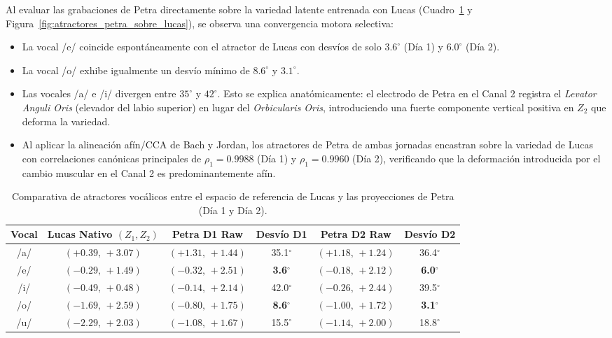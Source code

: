 \documentclass[11pt,a4paper,openany]{book}
\theoremstyle{definition}
\begin{document}
Al evaluar las grabaciones de Petra directamente sobre la variedad latente entrenada con Lucas (Cuadro~\ref{tab:atractores_lucas_petra} y Figura~\ref{fig:atractores_petra_sobre_lucas}), se observa una convergencia motora selectiva:
\begin{itemize}
    \item La vocal /e/ coincide espontáneamente con el atractor de Lucas con desvíos de solo $3.6^\circ$ (Día 1) y $6.0^\circ$ (Día 2).
    \item La vocal /o/ exhibe igualmente un desvío mínimo de $8.6^\circ$ y $3.1^\circ$.
    \item Las vocales /a/ e /i/ divergen entre $35^\circ$ y $42^\circ$. Esto se explica anatómicamente: el electrodo de Petra en el Canal 2 registra el \textit{Levator Anguli Oris} (elevador del labio superior) en lugar del \textit{Orbicularis Oris}, introduciendo una fuerte componente vertical positiva en $Z_2$ que deforma la variedad.
    \item Al aplicar la alineación afín/CCA de Bach y Jordan, los atractores de Petra de ambas jornadas encastran sobre la variedad de Lucas con correlaciones canónicas principales de $\rho_1 = 0.9988$ (Día 1) y $\rho_1 = 0.9960$ (Día 2), verificando que la deformación introducida por el cambio muscular en el Canal 2 es predominantemente afín.
\end{itemize}

\begin{table}[H]
\centering
\small
\begin{tabular}{cccccc}
\toprule
\textbf{Vocal} & \textbf{Lucas Nativo $(Z_1, Z_2)$} & \textbf{Petra D1 Raw} & \textbf{Desvío D1} & \textbf{Petra D2 Raw} & \textbf{Desvío D2} \\
\midrule
/a/ & $(+0.39,\,+3.07)$ & $(+1.31,\,+1.44)$ & 35.1$^\circ$ & $(+1.18,\,+1.24)$ & 36.4$^\circ$ \\
/e/ & $(-0.29,\,+1.49)$ & $(-0.32,\,+2.51)$ & \textbf{3.6}$^\circ$ & $(-0.18,\,+2.12)$ & \textbf{6.0}$^\circ$ \\
/i/ & $(-0.49,\,+0.48)$ & $(-0.14,\,+2.14)$ & 42.0$^\circ$ & $(-0.26,\,+2.44)$ & 39.5$^\circ$ \\
/o/ & $(-1.69,\,+2.59)$ & $(-0.80,\,+1.75)$ & \textbf{8.6}$^\circ$ & $(-1.00,\,+1.72)$ & \textbf{3.1}$^\circ$ \\
/u/ & $(-2.29,\,+2.03)$ & $(-1.08,\,+1.67)$ & 15.5$^\circ$ & $(-1.14,\,+2.00)$ & 18.8$^\circ$ \\
\bottomrule
\end{tabular}
\caption{Comparativa de atractores vocálicos entre el espacio de referencia de Lucas y las proyecciones de Petra (Día 1 y Día 2).}
\label{tab:atractores_lucas_petra}
\end{table}
\end{document}
